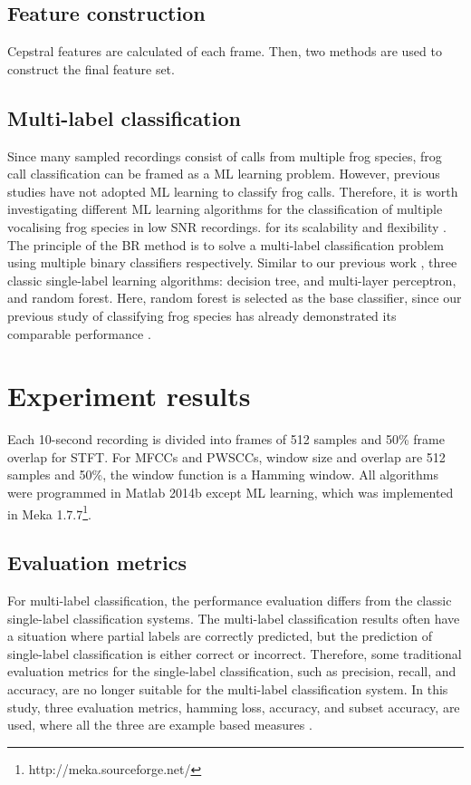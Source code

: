\subsection{Feature construction}

Cepstral features are calculated of each frame. Then, two methods are used to construct the final feature set.




\subsection{Multi-label classification} 
Since many sampled recordings consist of calls from multiple frog species, frog call classification can be framed as a ML learning problem. However, previous studies have not adopted ML learning to classify frog calls. Therefore, it is worth investigating different ML learning algorithms for the classification of multiple vocalising frog species in low SNR recordings. for its scalability and flexibility \citep{read2011classifier}. The principle of the BR method is to solve a multi-label classification problem using multiple binary classifiers respectively. Similar to our previous work \citep{zhang2016using}, 
three classic single-label learning algorithms: decision tree, and multi-layer perceptron, and random forest. Here, random forest is selected as the base classifier, since our previous study of classifying frog species has already demonstrated its comparable performance \citep{xie2016acoustic}. 

\section{Experiment results}
Each 10-second recording is divided into frames of 512 samples and 50\% frame overlap for STFT. For MFCCs and PWSCCs, window size and overlap are 512 samples and 50\%, the window function is a Hamming window. All algorithms were programmed in Matlab 2014b except ML learning, which was implemented in Meka 1.7.7\footnote[4]{http://meka.sourceforge.net/}. 







\subsection{Evaluation metrics}
For multi-label classification, the performance evaluation differs from the classic single-label classification systems. The multi-label classification results often have a situation where partial labels are correctly predicted, but the prediction of single-label classification is either correct or incorrect. Therefore, some traditional evaluation metrics for the single-label classification, such as precision, recall, and accuracy, are no longer suitable for the multi-label classification system. In this study, three evaluation metrics, hamming loss, accuracy, and subset accuracy, are used, where all the three are example based measures \citep{madjarov2012extensive}.


